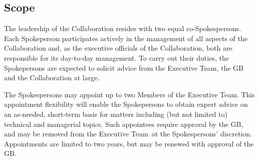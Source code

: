 \documentclass[12pt]{article}
\newcommand{\exec}{{Executive Team}}
\begin{document}
\subsection{Scope}

The	%
leadership of the Collaboration resides with two equal co-Spokespersons.			
Each Spokeperson participates actively in the management of all aspects of the Collaboration and, as the executive officials of the Collaboration, both  are responsible for its day-to-day management. 
To carry out their duties, the Spokepersons are expected to solicit advice from the \exec, the GB and the Collaboration at large.  %

The Spokespersons may appoint up to two Members of the \exec. This appointment flexibility will enable the Spokepersons to obtain expert advice on an as-needed, short-term basis for matters including (but not limited to) technical and managerial topics.
Such appointees require approval by the GB, 
and may be removed from the \exec\ at the Spokespersons' discretion.  Appointments are limited to two years, but may be renewed with approval of the GB. 
\end{document}
